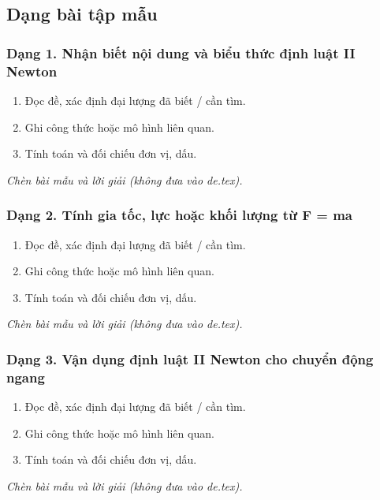 

\subsection{Dạng bài tập mẫu}
\subsubsection{Dạng 1. Nhận biết nội dung và biểu thức định luật II Newton}
\begin{phuongphap}
\begin{enumerate}
\item Đọc đề, xác định đại lượng đã biết / cần tìm.
\item Ghi công thức hoặc mô hình liên quan.
\item Tính toán và đối chiếu đơn vị, dấu.
\end{enumerate}
\end{phuongphap}
\begin{vidumau}
\textit{Chèn bài mẫu và lời giải (không đưa vào de.tex).}
\end{vidumau}

\subsubsection{Dạng 2. Tính gia tốc, lực hoặc khối lượng từ F = ma}
\begin{phuongphap}
\begin{enumerate}
\item Đọc đề, xác định đại lượng đã biết / cần tìm.
\item Ghi công thức hoặc mô hình liên quan.
\item Tính toán và đối chiếu đơn vị, dấu.
\end{enumerate}
\end{phuongphap}
\begin{vidumau}
\textit{Chèn bài mẫu và lời giải (không đưa vào de.tex).}
\end{vidumau}

\subsubsection{Dạng 3. Vận dụng định luật II Newton cho chuyển động ngang}
\begin{phuongphap}
\begin{enumerate}
\item Đọc đề, xác định đại lượng đã biết / cần tìm.
\item Ghi công thức hoặc mô hình liên quan.
\item Tính toán và đối chiếu đơn vị, dấu.
\end{enumerate}
\end{phuongphap}
\begin{vidumau}
\textit{Chèn bài mẫu và lời giải (không đưa vào de.tex).}
\end{vidumau}

